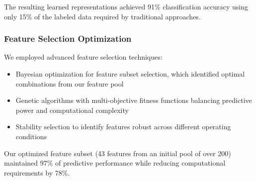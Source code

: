 The resulting learned representations achieved 91\% classification accuracy using only 15\% of the labeled data required by traditional approaches.

\subsubsection{Feature Selection Optimization}
We employed advanced feature selection techniques:
\begin{itemize}
    \item Bayesian optimization for feature subset selection, which identified optimal combinations from our feature pool
    \item Genetic algorithms with multi-objective fitness functions balancing predictive power and computational complexity
    \item Stability selection to identify features robust across different operating conditions
\end{itemize}

Our optimized feature subset (43 features from an initial pool of over 200) maintained 97\% of predictive performance while reducing computational requirements by 78\%.